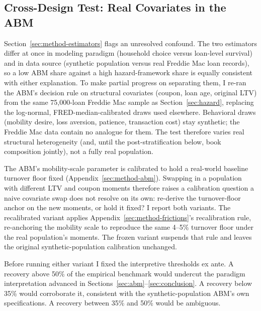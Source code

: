 \documentclass[12pt]{article}
\begin{document}
\subsection{Cross-Design Test: Real Covariates in the ABM}\label{sec:robustness-crossdesign}

Section~\ref{sec:method-estimators} flags an unresolved confound. The two estimators differ at once in modeling paradigm (household choice versus loan-level survival) and in data source (synthetic population versus real Freddie Mac loan records), so a low ABM share against a high hazard-framework share is equally consistent with either explanation. To make partial progress on separating them, I re-ran the ABM's decision rule on structural covariates (coupon, loan age, original LTV) from the same 75,000-loan Freddie Mac sample as Section~\ref{sec:hazard}, replacing the log-normal, FRED-median-calibrated draws used elsewhere. Behavioral draws (mobility desire, loss aversion, patience, transaction cost) stay synthetic; the Freddie Mac data contain no analogue for them. The test therefore varies real structural heterogeneity (and, until the post-stratification below, book composition jointly), not a fully real population.

The ABM's mobility-scale parameter is calibrated to hold a real-world baseline turnover floor fixed (Appendix~\ref{sec:method-abm}). Swapping in a population with different LTV and coupon moments therefore raises a calibration question a naive covariate swap does not resolve on its own: re-derive the turnover-floor anchor on the new moments, or hold it fixed? I report both variants. The recalibrated variant applies Appendix~\ref{sec:method-frictions}'s recalibration rule, re-anchoring the mobility scale to reproduce the same 4--5\% turnover floor under the real population's moments. The frozen variant suspends that rule and leaves the original synthetic-population calibration unchanged.

Before running either variant I fixed the interpretive thresholds ex ante. A recovery above 50\% of the empirical benchmark would undercut the paradigm interpretation advanced in Sections~\ref{sec:abm}--\ref{sec:conclusion}. A recovery below 35\% would corroborate it, consistent with the synthetic-population ABM's own specifications. A recovery between 35\% and 50\% would be ambiguous.
\end{document}
